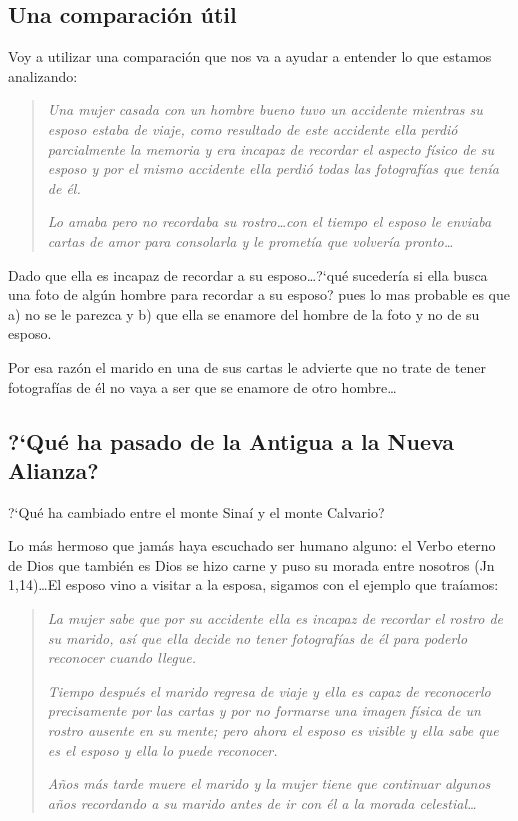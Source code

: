 \documentclass{article}
\begin{document}
\subsection{Una comparaci\'on \'util}

Voy a utilizar una comparaci\'on que nos va a ayudar a entender lo que estamos analizando:

\begin{quote}
\emph{Una mujer casada con un hombre bueno tuvo un accidente mientras su esposo estaba de viaje, como resultado de este accidente ella perdi\'o parcialmente la memoria y era incapaz de recordar el aspecto f\'{i}sico de su esposo y por el mismo accidente ella perdi\'o todas las fotograf\'{i}as que ten\'{i}a de \'el.}

\emph{Lo amaba pero no recordaba su rostro\ldots con el tiempo el esposo le enviaba cartas de amor para consolarla y le promet\'{i}a que volver\'{i}a pronto\ldots}
\end{quote}

\noindent
Dado que ella es incapaz de recordar a su esposo\ldots ?`qu\'e suceder\'{i}a si ella busca una foto de alg\'un hombre para recordar a su esposo? pues lo mas probable es que a) no se le parezca y b) que ella se enamore del hombre de la foto y no de su esposo.

Por esa raz\'on el marido en una de sus cartas le advierte que no trate de tener fotograf\'{i}as de \'el no vaya a ser que se enamore de otro hombre\ldots

\subsection{?`Qu\'e ha pasado de la Antigua a la Nueva Alianza?}
?`Qu\'e ha cambiado entre el monte Sina\'{i} y el monte Calvario?

Lo m\'as hermoso que jam\'as haya escuchado ser humano alguno: el Verbo eterno de Dios que tambi\'en es Dios se hizo carne y puso su morada entre nosotros (Jn 1,14)\ldots El esposo vino a visitar a la esposa, sigamos con el ejemplo que tra\'{i}amos:

\begin{quote}
\emph{La mujer sabe que por su accidente ella es incapaz de recordar el rostro de su marido, as\'{i} que ella decide no tener fotograf\'{i}as de \'el para poderlo reconocer cuando llegue.}

\emph{Tiempo despu\'es el marido regresa de viaje y ella es capaz de reconocerlo precisamente por las cartas y por no formarse una imagen f\'{i}sica de un rostro ausente en su mente; pero ahora el esposo es visible y ella sabe que es el esposo y ella lo puede reconocer.}

\emph{A\~nos m\'as tarde muere el marido y la mujer tiene que continuar algunos a\~nos recordando a su marido antes de ir con \'el a la morada celestial\ldots}
\end{quote}
\end{document}
